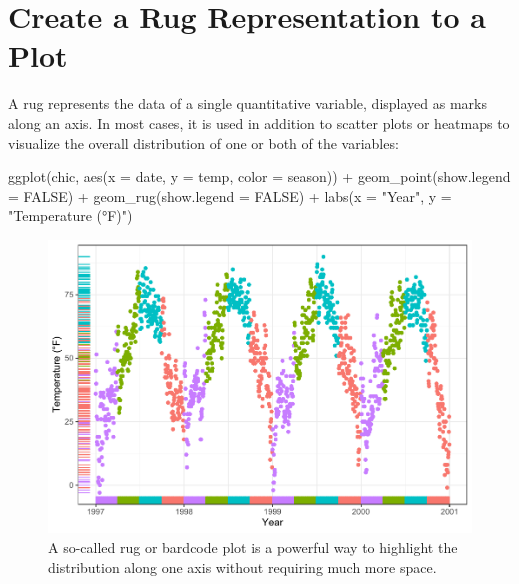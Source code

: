 \documentclass[
]{krantz}
\makeatletter
\newenvironment{Shaded}{\begin{snugshade}}{\end{snugshade}}
\newcommand{\AttributeTok}[1]{\textcolor[rgb]{0.61,0.61,0.61}{#1}}
\newcommand{\ConstantTok}[1]{\textcolor[rgb]{0,0,0}{#1}}
\newcommand{\FunctionTok}[1]{\textcolor[rgb]{0,0,0}{#1}}
\newcommand{\NormalTok}[1]{#1}
\newcommand{\SpecialCharTok}[1]{\textcolor[rgb]{0,0,0}{#1}}
\newcommand{\StringTok}[1]{\textcolor[rgb]{0.5,0.5,0.5}{#1}}
\newenvironment{kframe}{%
\medskip{}
\setlength{\fboxsep}{.8em}
 \def\at@end@of@kframe{}%
 \ifinner\ifhmode%
  \def\at@end@of@kframe{\end{minipage}}%
  \begin{minipage}{\columnwidth}%
 \fi\fi%
 \def\FrameCommand##1{\hskip\@totalleftmargin \hskip-\fboxsep
 \colorbox{shadecolor}{##1}\hskip-\fboxsep
     \hskip-\linewidth \hskip-\@totalleftmargin \hskip\columnwidth}%
 \MakeFramed {\advance\hsize-\width
   \@totalleftmargin\z@ \linewidth\hsize
   \@setminipage}}%
 {\par\unskip\endMakeFramed%
 \at@end@of@kframe}
\renewenvironment{Shaded}{\begin{kframe}}{\end{kframe}}
\makeatother
\begin{document}
\hypertarget{create-a-rug-representation-to-a-plot}{%
\section{Create a Rug Representation to a Plot}\label{create-a-rug-representation-to-a-plot}}

A rug represents the data of a single quantitative variable, displayed as marks along an axis. In most cases, it is used in addition to scatter plots or heatmaps to visualize the overall distribution of one or both of the variables:

\begin{Shaded}
\begin{Highlighting}[]
\FunctionTok{ggplot}\NormalTok{(chic, }\FunctionTok{aes}\NormalTok{(}\AttributeTok{x =}\NormalTok{ date, }\AttributeTok{y =}\NormalTok{ temp,}
                 \AttributeTok{color =}\NormalTok{ season)) }\SpecialCharTok{+}
  \FunctionTok{geom\_point}\NormalTok{(}\AttributeTok{show.legend =} \ConstantTok{FALSE}\NormalTok{) }\SpecialCharTok{+}
  \FunctionTok{geom\_rug}\NormalTok{(}\AttributeTok{show.legend =} \ConstantTok{FALSE}\NormalTok{) }\SpecialCharTok{+}
  \FunctionTok{labs}\NormalTok{(}\AttributeTok{x =} \StringTok{"Year"}\NormalTok{, }\AttributeTok{y =} \StringTok{"Temperature (°F)"}\NormalTok{)}
\end{Highlighting}
\end{Shaded}

\begin{figure}
\centering
\includegraphics{bookdown_files/figure-latex/rug-1.pdf}
\caption{\label{fig:rug}A so-called rug or bardcode plot is a powerful way to highlight the distribution along one axis without requiring much more space.}
\end{figure}
\end{document}
